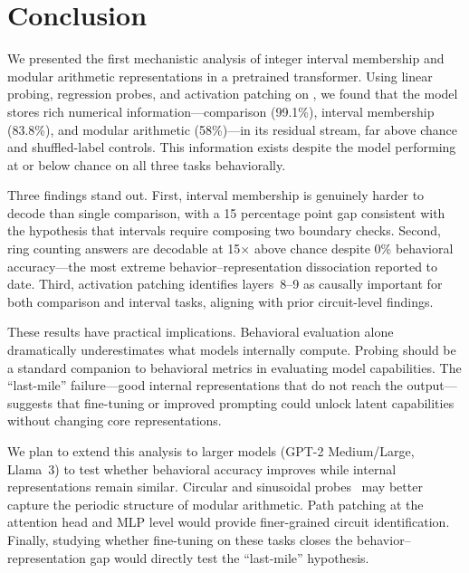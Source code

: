 \section{Conclusion}
\label{sec:conclusion}

We presented the first mechanistic analysis of integer interval membership and modular arithmetic representations in a pretrained transformer. Using linear probing, regression probes, and activation patching on \gptsmall, we found that the model stores rich numerical information---comparison (99.1\%), interval membership (83.8\%), and modular arithmetic (58\%)---in its residual stream, far above chance and shuffled-label controls. This information exists despite the model performing at or below chance on all three tasks behaviorally.

Three findings stand out. First, interval membership is genuinely harder to decode than single comparison, with a 15 percentage point gap consistent with the hypothesis that intervals require composing two boundary checks. Second, ring counting answers are decodable at 15$\times$ above chance despite 0\% behavioral accuracy---the most extreme behavior--representation dissociation reported to date. Third, activation patching identifies layers~8--9 as causally important for both comparison and interval tasks, aligning with prior circuit-level findings.

These results have practical implications. Behavioral evaluation alone dramatically underestimates what models internally compute. Probing should be a standard companion to behavioral metrics in evaluating model capabilities. The ``last-mile'' failure---good internal representations that do not reach the output---suggests that fine-tuning or improved prompting could unlock latent capabilities without changing core representations.

 We plan to extend this analysis to larger models (GPT-2 Medium/Large, Llama~3) to test whether behavioral accuracy improves while internal representations remain similar. Circular and sinusoidal probes~\citep{levy2024language, kadlcik2025pretrained} may better capture the periodic structure of modular arithmetic. Path patching at the attention head and MLP level would provide finer-grained circuit identification. Finally, studying whether fine-tuning on these tasks closes the behavior--representation gap would directly test the ``last-mile'' hypothesis.
